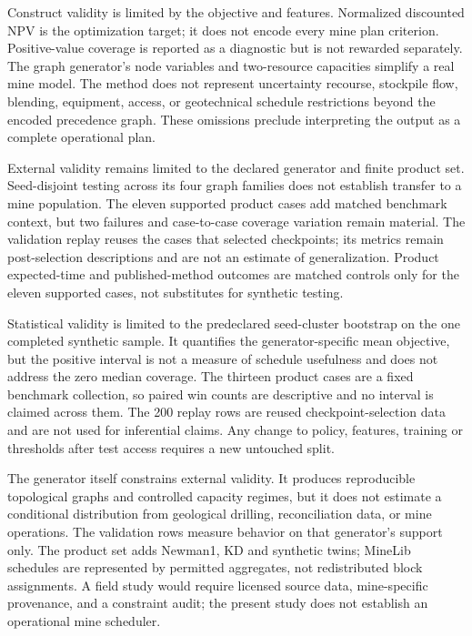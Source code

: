 \documentclass[11pt]{article}
\begin{document}
Construct validity is limited by the objective and features. Normalized discounted NPV is the optimization target; it does not encode every mine plan criterion. Positive-value coverage is reported as a diagnostic but is not rewarded separately. The graph generator's node variables and two-resource capacities simplify a real mine model. The method does not represent uncertainty recourse, stockpile flow, blending, equipment, access, or geotechnical schedule restrictions beyond the encoded precedence graph. These omissions preclude interpreting the output as a complete operational plan.

External validity remains limited to the declared generator and finite product set. Seed-disjoint testing across its four graph families does not establish transfer to a mine population. The eleven supported product cases add matched benchmark context, but two failures and case-to-case coverage variation remain material. The validation replay reuses the cases that selected checkpoints; its metrics remain post-selection descriptions and are not an estimate of generalization. Product expected-time and published-method outcomes are matched controls only for the eleven supported cases, not substitutes for synthetic testing.

Statistical validity is limited to the predeclared seed-cluster bootstrap on the one completed synthetic sample. It quantifies the generator-specific mean objective, but the positive interval is not a measure of schedule usefulness and does not address the zero median coverage. The thirteen product cases are a fixed benchmark collection, so paired win counts are descriptive and no interval is claimed across them. The 200 replay rows are reused checkpoint-selection data and are not used for inferential claims. Any change to policy, features, training or thresholds after test access requires a new untouched split.

The generator itself constrains external validity. It produces reproducible topological graphs and controlled capacity regimes, but it does not estimate a conditional distribution from geological drilling, reconciliation data, or mine operations. The validation rows measure behavior on that generator's support only. The product set adds Newman1, KD and synthetic twins; MineLib schedules are represented by permitted aggregates, not redistributed block assignments. A field study would require licensed source data, mine-specific provenance, and a constraint audit; the present study does not establish an operational mine scheduler.
\end{document}
